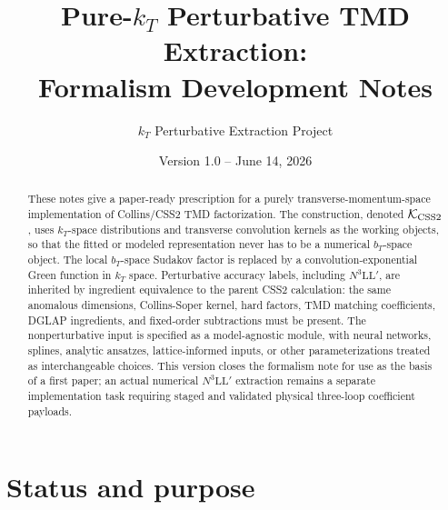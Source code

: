 \documentclass[11pt]{article}
\title{Pure-$k_T$ Perturbative TMD Extraction:\\Formalism Development Notes}
\author{$k_T$ Perturbative Extraction Project}
\date{Version 1.0 -- June 14, 2026}
\newcommand{\KCSS}{\mathcal K_{\rm CSS2}}
\begin{document}
\maketitle

\begin{abstract}
These notes give a paper-ready prescription for a purely transverse-momentum-space
implementation of Collins/CSS2 TMD factorization.  The construction, denoted $\KCSS$,
uses $k_T$-space distributions and transverse convolution kernels as the working
objects, so that the fitted or modeled representation never has to be a numerical
$b_T$-space object.  The local $b_T$-space Sudakov factor is replaced by a
convolution-exponential Green function in $k_T$ space.  Perturbative accuracy labels,
including $N^3\mathrm{LL}'$, are inherited by ingredient equivalence to the parent CSS2
calculation: the same anomalous dimensions, Collins-Soper kernel, hard factors, TMD
matching coefficients, DGLAP ingredients, and fixed-order subtractions must be present.
The nonperturbative input is specified as a model-agnostic module, with neural networks,
splines, analytic ansatzes, lattice-informed inputs, or other parameterizations treated
as interchangeable choices.  This version closes the formalism note for use as the basis
of a first paper; an actual numerical $N^3\mathrm{LL}'$ extraction remains a separate
implementation task requiring staged and validated physical three-loop coefficient
payloads.
\end{abstract}

\tableofcontents

\section{Status and purpose}
\end{document}
